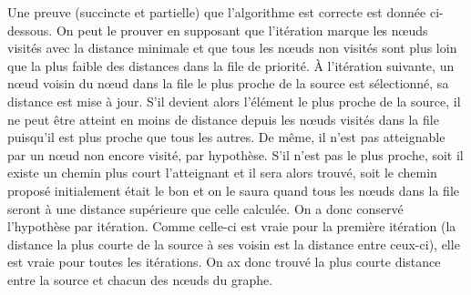 \documentclass{article}
\begin{document}
Une preuve (succincte et partielle) que l'algorithme est correcte est
donnée ci-dessous. On peut le prouver en supposant que
l'itération marque les nœuds visités avec la distance minimale et que
tous les nœuds non visités sont plus loin que la plus faible des
distances dans la file de priorité.
À l'itération suivante, un nœud voisin du nœud dans la file le plus
proche de la source est sélectionné, sa distance est mise à jour. S'il
devient alors l'élément le plus proche de la source, il ne peut être
atteint en moins de distance depuis les nœuds visités dans la file
puisqu'il est plus proche que tous les autres. De même, il n'est pas
atteignable par un nœud non encore visité, par hypothèse. S'il n'est
pas le plus proche, soit il existe un chemin plus court l'atteignant
et il sera alors trouvé, soit le chemin proposé initialement était le
bon et on le saura quand tous les nœuds dans la file seront à une
distance supérieure que celle calculée. On a donc conservé l'hypothèse
par itération.
Comme celle-ci est vraie pour la première itération (la distance la
plus courte de la source à ses voisin est la distance entre ceux-ci),
elle est vraie pour toutes les itérations. On ax donc trouvé la plus
courte distance entre la source et chacun des nœuds du graphe.
\end{document}
